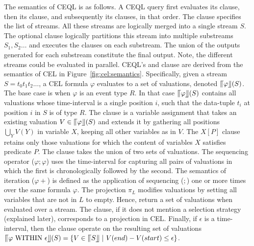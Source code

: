 The semantics of CEQL is as follows. A CEQL query first evaluates its  clause, then its  clause, and subsequently its  clauses, in that order. The  clause specifies the list of streams. All these streams are logically merged into a single stream $S$. The optional  clause logically partitions this stream into multiple substreams $S_{1}, S_{2}\ldots$ and executes the  clauses on each substream. The union of the outputs generated for each substream constitute the final output. Note, the different streams could be evaluated in parallel. CEQL's  and  clause are derived from the semantics of CEL in Figure~\ref{fig:cel:semantics}. Specifically, given a stream $S = t_{0}t_{1}t_{2} \ldots $, a CEL formula $\varphi$ evaluates to a set of valuations, denoted $\llceil \varphi \rrfloor(S)$. The base case is when $\varphi$ is an event type $R$. In that case $\llceil \varphi \rrfloor(S)$ contains all valuations whose time-interval is a single position $i$, such that the data-tuple $t_{i}$ at position $i$ in $S$ is of type $R$. The  clause is a variable assignment that takes an existing valuation $V \in \llceil \varphi \rrfloor(S)$ and extends it by gathering all positions $\bigcup_{Y}V(Y)$ in variable $X$, keeping all other variables as in $V$. The  $X[P]$ clause retains only those valuations for which the content of variables $X$ satisfies predicate $P$. The  clause takes the union of two sets of valuations. The sequencing operator ($\varphi;\varphi$) uses the time-interval for capturing all pairs of valuations in which the first is chronologically followed by the second. The semantics of iteration ($\varphi+$) is defined as the application of sequencing ($;$) one or more times over the same formula $\varphi$. The projection $\pi_{L}$ modifies valuations by setting all variables that are not in $L$ to empty. Hence,  return a set of valuations when evaluated over a stream. The  clause, if it does not mention a selection strategy (explained later), corresponds to a projection in CEL. Finally, if $\epsilon$ is a time-interval, then the  clause operate on the resulting set of valuations $\InSBrackets{\varphi \ \text{WITHIN} \ \epsilon}(S) = \{ V \in \InSBrackets{S} \ | \ V(end) - V(start) \le \epsilon \}$.

